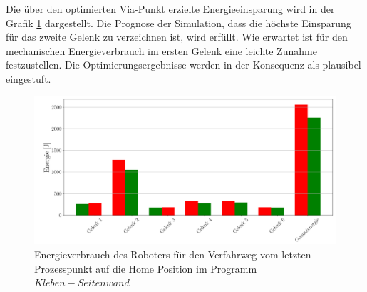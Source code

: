 Die über den optimierten Via-Punkt erzielte Energieeinsparung wird in der Grafik \ref{fig:eup500} dargestellt. Die Prognose der Simulation, dass die höchste Einsparung für das zweite Gelenk zu verzeichnen ist, wird erfüllt. Wie erwartet ist für den mechanischen Energieverbrauch im ersten Gelenk eine leichte Zunahme festzustellen. Die Optimierungsergebnisse werden in der Konsequenz als plausibel eingestuft. 
%
\begin{figure}[tbph]
	\centering
	\includegraphics[width=1\linewidth]{images/e_up500}
	\caption{Energieverbrauch des Roboters für den Verfahrweg vom letzten Prozesspunkt auf die  Home Position im Programm $Kleben-Seitenwand$}
	\label{fig:eup500}        
\end{figure}
%